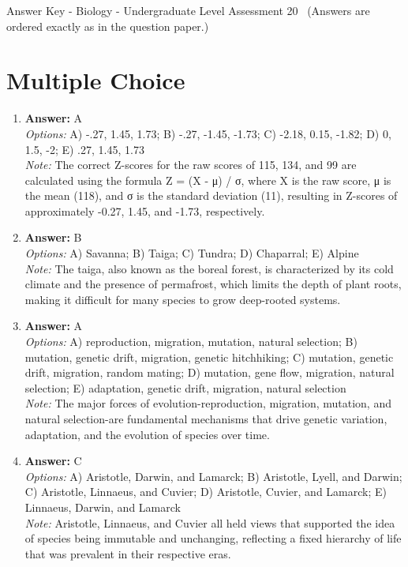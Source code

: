 \documentclass[12pt]{article}
\begin{document}
\begin{center}
Answer Key - Biology - Undergraduate Level Assessment 20 \
\small (Answers are ordered exactly as in the question paper.)
\end{center}

\section*{Multiple Choice}
\begin{enumerate}[label=\arabic*.]
\item \textbf{Answer:} A
\\ \textit{Options:} A) -.27, 1.45, 1.73; B) -.27, -1.45, -1.73; C) -2.18, 0.15, -1.82; D) 0, 1.5, -2; E) .27, 1.45, 1.73
\\ \textit{Note:} The correct Z-scores for the raw scores of 115, 134, and 99 are calculated using the formula Z = (X - μ) / σ, where X is the raw score, μ is the mean (118), and σ is the standard deviation (11), resulting in Z-scores of approximately -0.27, 1.45, and -1.73, respectively.
\item \textbf{Answer:} B
\\ \textit{Options:} A) Savanna; B) Taiga; C) Tundra; D) Chaparral; E) Alpine
\\ \textit{Note:} The taiga, also known as the boreal forest, is characterized by its cold climate and the presence of permafrost, which limits the depth of plant roots, making it difficult for many species to grow deep-rooted systems.
\item \textbf{Answer:} A
\\ \textit{Options:} A) reproduction, migration, mutation, natural selection; B) mutation, genetic drift, migration, genetic hitchhiking; C) mutation, genetic drift, migration, random mating; D) mutation, gene flow, migration, natural selection; E) adaptation, genetic drift, migration, natural selection
\\ \textit{Note:} The major forces of evolution-reproduction, migration, mutation, and natural selection-are fundamental mechanisms that drive genetic variation, adaptation, and the evolution of species over time.
\item \textbf{Answer:} C
\\ \textit{Options:} A) Aristotle, Darwin, and Lamarck; B) Aristotle, Lyell, and Darwin; C) Aristotle, Linnaeus, and Cuvier; D) Aristotle, Cuvier, and Lamarck; E) Linnaeus, Darwin, and Lamarck
\\ \textit{Note:} Aristotle, Linnaeus, and Cuvier all held views that supported the idea of species being immutable and unchanging, reflecting a fixed hierarchy of life that was prevalent in their respective eras.

\end{enumerate}
\end{document}
